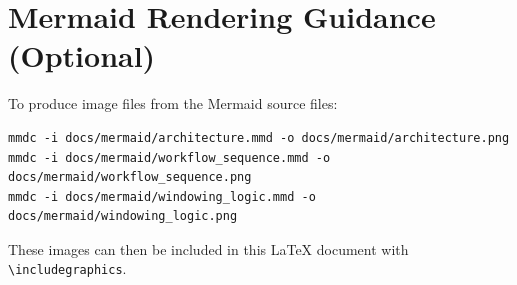 \documentclass[11pt,a4paper]{article}
\begin{document}
\section{Mermaid Rendering Guidance (Optional)}
To produce image files from the Mermaid source files:
\begin{lstlisting}[basicstyle=\ttfamily\small,frame=single]
mmdc -i docs/mermaid/architecture.mmd -o docs/mermaid/architecture.png
mmdc -i docs/mermaid/workflow_sequence.mmd -o docs/mermaid/workflow_sequence.png
mmdc -i docs/mermaid/windowing_logic.mmd -o docs/mermaid/windowing_logic.png
\end{lstlisting}

These images can then be included in this LaTeX document with \texttt{\textbackslash includegraphics}.
\end{document}
